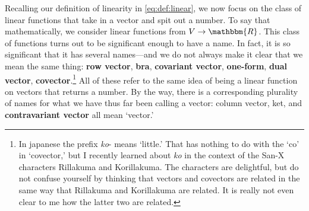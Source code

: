 \documentclass[
  11pt,
	colorful,
	raggedright,
]{tufte-style-thesis-flip}
\begin{document}
Recalling our definition of linearity in \eqref{eq:def:linear}, we now focus on the class of linear functions that take in a vector and spit out a number. To say that mathematically, we consider linear functions from $V\to \mathbbm{R}$. This class of functions turns out to be significant enough to have a name. In fact, it is so significant that it has several names---and we do not always make it clear that we mean the same thing: \textbf{row vector}, \textbf{bra}, \textbf{covariant vector}, \textbf{one-form}, \textbf{dual vector}, \textbf{covector}.\footnote{In japanese the prefix \emph{ko}- means `little.' That has nothing to do with the `co' in `covector,' but I recently learned about \emph{ko} in the context of the San-X characters Rillakuma and Korillakuma. The characters are delightful, but do not confuse yourself by thinking that vectors and covectors are related in the same way that Rillakuma and Korillakuma are related. It is really not even clear to me how the latter two are related.} All of these refer to the same idea of being a linear function on vectors that returns a number. By the way, there is a corresponding plurality of names for what we have thus far been calling a vector: column vector, ket, and \textbf{contravariant vector} all mean `vector.' 
\end{document}
